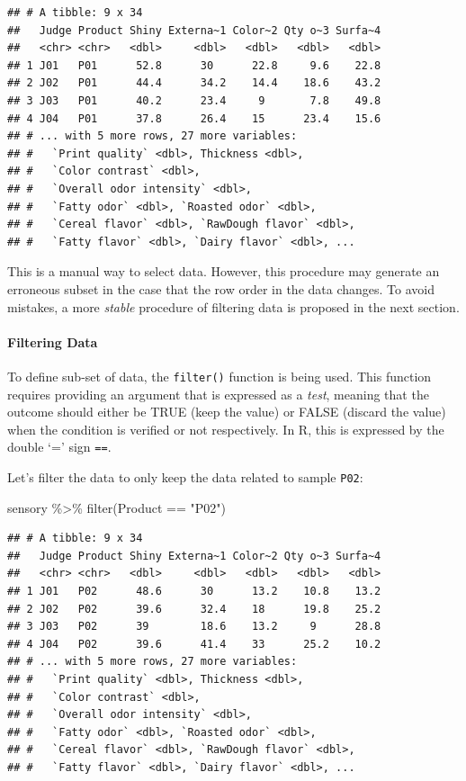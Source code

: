 \documentclass[
]{krantz}
\makeatletter
\newenvironment{Shaded}{\begin{snugshade}}{\end{snugshade}}
\newcommand{\FunctionTok}[1]{\textcolor[rgb]{0,0,0}{#1}}
\newcommand{\NormalTok}[1]{#1}
\newcommand{\SpecialCharTok}[1]{\textcolor[rgb]{0,0,0}{#1}}
\newcommand{\StringTok}[1]{\textcolor[rgb]{0.5,0.5,0.5}{#1}}
\newenvironment{kframe}{%
\medskip{}
\setlength{\fboxsep}{.8em}
 \def\at@end@of@kframe{}%
 \ifinner\ifhmode%
  \def\at@end@of@kframe{\end{minipage}}%
  \begin{minipage}{\columnwidth}%
 \fi\fi%
 \def\FrameCommand##1{\hskip\@totalleftmargin \hskip-\fboxsep
 \colorbox{shadecolor}{##1}\hskip-\fboxsep
     \hskip-\linewidth \hskip-\@totalleftmargin \hskip\columnwidth}%
 \MakeFramed {\advance\hsize-\width
   \@totalleftmargin\z@ \linewidth\hsize
   \@setminipage}}%
 {\par\unskip\endMakeFramed%
 \at@end@of@kframe}
\renewenvironment{Shaded}{\begin{kframe}}{\end{kframe}}
\makeatother
\begin{document}
\begin{verbatim}
## # A tibble: 9 x 34
##   Judge Product Shiny Externa~1 Color~2 Qty o~3 Surfa~4
##   <chr> <chr>   <dbl>     <dbl>   <dbl>   <dbl>   <dbl>
## 1 J01   P01      52.8      30      22.8     9.6    22.8
## 2 J02   P01      44.4      34.2    14.4    18.6    43.2
## 3 J03   P01      40.2      23.4     9       7.8    49.8
## 4 J04   P01      37.8      26.4    15      23.4    15.6
## # ... with 5 more rows, 27 more variables:
## #   `Print quality` <dbl>, Thickness <dbl>,
## #   `Color contrast` <dbl>,
## #   `Overall odor intensity` <dbl>,
## #   `Fatty odor` <dbl>, `Roasted odor` <dbl>,
## #   `Cereal flavor` <dbl>, `RawDough flavor` <dbl>,
## #   `Fatty flavor` <dbl>, `Dairy flavor` <dbl>, ...
\end{verbatim}

This is a manual way to select data. However, this procedure may generate an erroneous subset in the case that the row order in the data changes. To avoid mistakes, a more \emph{stable} procedure of filtering data is proposed in the next section.

\hypertarget{filtering-data}{%
\paragraph*{Filtering Data}\label{filtering-data}}

To define sub-set of data, the \texttt{filter()} function is being used. This function requires providing an argument that is expressed as a \emph{test}, meaning that the outcome should either be TRUE (keep the value) or FALSE (discard the value) when the condition is verified or not respectively. In R, this is expressed by the double `=' sign \texttt{==}.

Let's filter the data to only keep the data related to sample \texttt{P02}:

\begin{Shaded}
\begin{Highlighting}[]
\NormalTok{sensory }\SpecialCharTok{\%\textgreater{}\%}
  \FunctionTok{filter}\NormalTok{(Product }\SpecialCharTok{==} \StringTok{"P02"}\NormalTok{)}
\end{Highlighting}
\end{Shaded}

\begin{verbatim}
## # A tibble: 9 x 34
##   Judge Product Shiny Externa~1 Color~2 Qty o~3 Surfa~4
##   <chr> <chr>   <dbl>     <dbl>   <dbl>   <dbl>   <dbl>
## 1 J01   P02      48.6      30      13.2    10.8    13.2
## 2 J02   P02      39.6      32.4    18      19.8    25.2
## 3 J03   P02      39        18.6    13.2     9      28.8
## 4 J04   P02      39.6      41.4    33      25.2    10.2
## # ... with 5 more rows, 27 more variables:
## #   `Print quality` <dbl>, Thickness <dbl>,
## #   `Color contrast` <dbl>,
## #   `Overall odor intensity` <dbl>,
## #   `Fatty odor` <dbl>, `Roasted odor` <dbl>,
## #   `Cereal flavor` <dbl>, `RawDough flavor` <dbl>,
## #   `Fatty flavor` <dbl>, `Dairy flavor` <dbl>, ...
\end{verbatim}
\end{document}

